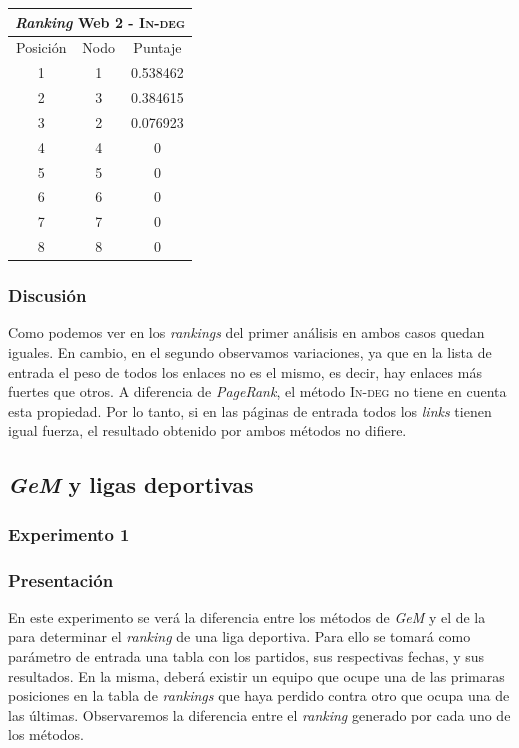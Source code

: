 \begin{center}
	      			\begin{tabular}{c|c|c}
			      		\hline
			  				\multicolumn{3}{c}{\emph{Ranking} Web 2 - \textsc{In-deg}} \\
			 			\hline
	        			Posición & Nodo & Puntaje \\ \hline
	         			1 & 1 & 0.538462 \\
	        			2 & 3 & 0.384615 \\
	        			3 & 2 & 0.076923 \\
	        			4 & 4 & 0 \\
	        			5 & 5 & 0 \\
	        			6 & 6 & 0 \\
	        			7 & 7 & 0 \\
	        			8 & 8 & 0 \\
	      			\end{tabular}
	    	\end{center}

			\subsubsection*{Discusión} 
			Como podemos ver en los \emph{rankings} del primer análisis en ambos casos quedan iguales. En cambio, en el segundo observamos variaciones, ya que en la lista de entrada el peso de todos los enlaces no es el mismo, es decir, hay enlaces más fuertes que otros. A diferencia de \emph{PageRank}, el método \textsc{In-deg} no tiene en cuenta esta propiedad. Por lo tanto, si en las páginas de entrada todos los \emph{links} tienen igual fuerza, el resultado obtenido por ambos métodos no difiere. 


	\subsection{\emph{GeM} y ligas deportivas}
		
		\subsubsection{Experimento 1}
		\subsubsection*{Presentación}
		En este experimento se verá la diferencia entre los métodos de \emph{GeM} y el de la  para determinar el \emph{ranking} de una liga deportiva. Para ello se tomará como parámetro de entrada una tabla con los partidos, sus respectivas fechas, y sus resultados. En la misma, deberá existir un equipo que ocupe una de las primaras posiciones en la tabla de \emph{rankings} que haya perdido contra otro que ocupa una de las últimas. Observaremos la diferencia entre el \emph{ranking} generado por cada uno de los métodos.

